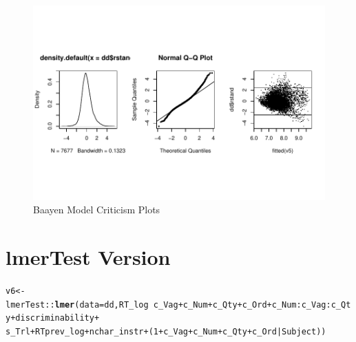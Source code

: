\documentclass[a4paper,12pt]{article}\usepackage[]{graphicx}\usepackage[]{color}
\makeatletter
\def\maxwidth{ %
  \ifdim\Gin@nat@width>\linewidth
    \linewidth
  \else
    \Gin@nat@width
  \fi
}
\newcommand{\hlnum}[1]{\textcolor[rgb]{0.686,0.059,0.569}{#1}}%
\newcommand{\hlopt}[1]{\textcolor[rgb]{0,0,0}{#1}}%
\newcommand{\hlstd}[1]{\textcolor[rgb]{0.345,0.345,0.345}{#1}}%
\newcommand{\hlkwb}[1]{\textcolor[rgb]{0.69,0.353,0.396}{#1}}%
\newcommand{\hlkwc}[1]{\textcolor[rgb]{0.333,0.667,0.333}{#1}}%
\newcommand{\hlkwd}[1]{\textcolor[rgb]{0.737,0.353,0.396}{\textbf{#1}}}%
\newenvironment{kframe}{%
 \def\at@end@of@kframe{}%
 \ifinner\ifhmode%
  \def\at@end@of@kframe{\end{minipage}}%
  \begin{minipage}{\columnwidth}%
 \fi\fi%
 \def\FrameCommand##1{\hskip\@totalleftmargin \hskip-\fboxsep
 \colorbox{shadecolor}{##1}\hskip-\fboxsep
     \hskip-\linewidth \hskip-\@totalleftmargin \hskip\columnwidth}%
 \MakeFramed {\advance\hsize-\width
   \@totalleftmargin\z@ \linewidth\hsize
   \@setminipage}}%
 {\par\unskip\endMakeFramed%
 \at@end@of@kframe}
\newenvironment{knitrout}{}{} %
\makeatother
\begin{document}
\begin{knitrout}\scriptsize
{}\color{fgcolor}\begin{figure}[hbtp]

{\centering \includegraphics[width=\maxwidth]{figure/graphics-baayenPLots99-1} 

}

\caption[Baayen Model Criticism Plots]{Baayen Model Criticism Plots}\label{fig:baayenPLots99}
\end{figure}


\end{knitrout}

\clearpage

\section{lmerTest Version}

\begin{knitrout}\scriptsize
{}\color{fgcolor}\begin{kframe}
\begin{alltt}
\hlstd{v6} \hlkwb{<-} \hlstd{lmerTest}\hlopt{::}\hlkwd{lmer}\hlstd{(}\hlkwc{data} \hlstd{= dd, RT_log} \hlopt{~} \hlstd{c_Vag} \hlopt{+} \hlstd{c_Num} \hlopt{+} \hlstd{c_Qty} \hlopt{+} \hlstd{c_Ord} \hlopt{+} \hlstd{c_Num}\hlopt{:}\hlstd{c_Vag}\hlopt{:}\hlstd{c_Qty} \hlopt{+} \hlstd{discriminability} \hlopt{+}
    \hlstd{s_Trl} \hlopt{+} \hlstd{RTprev_log} \hlopt{+} \hlstd{nchar_instr} \hlopt{+} \hlstd{(}\hlnum{1} \hlopt{+} \hlstd{c_Vag} \hlopt{+} \hlstd{c_Num} \hlopt{+} \hlstd{c_Qty} \hlopt{+} \hlstd{c_Ord} \hlopt{|} \hlstd{Subject))}
\end{alltt}
\end{kframe}
\end{knitrout}
\end{document}
